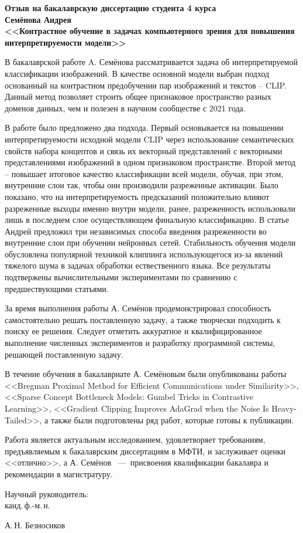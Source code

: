 \documentclass[12pt]{article}
\begin{document}
\thispagestyle{empty}
\begin{center}
\bigskip

\textbf{Отзыв на бакалаврскую диссертацию студента 4 курса\\
Семёнова Андрея\\
<<Контрастное обучение в задачах компьютерного зрения для повышения интерпретируемости модели>>}
\end{center}

В бакалаврской работе A. Семёнова рассматривается задача об интерпретируемой классификации изображений. В качестве основной модели выбран подход основанный на контрастном предобучении пар изображений и текстов -- CLIP. Данный метод позволяет строить общее признаковое пространство разных доменов данных, чем и полезен в научном сообществе с 2021 года.

В работе было предложено два подхода. Первый основывается на повышении интерпретируемости исходной модели CLIP через использование семантических свойств набора концептов и связь их векторный представлений с векторными представлениями изображений в одном признаковом пространстве. Второй метод -- повышает итоговое качество классификации всей модели, обучая, при этом, внутренние слои так, чтобы они производили разреженные активации. Было показано, что на интерпретируемость предсказаний положительно влияют разреженные выходы именно внутри модели, ранее, разреженность использовали лишь в последнем слое осуществляющем финальную классификацию. В статье Андрей предложил три независимых способа введения разреженности во внутренние слои при обучении нейронных сетей. Стабильность обучения модели обусловлена популярной техникой клиппинга использующегося из-за явлений тяжелого шума в задачах обработки ествественного языка. Все результаты подтвержены вычислительными экспериментами по сравнению с предшествующими статьями.

За время выполнения работы А. Семёнов продемонстрировал способность самостоятельно решать поставленную задачу, а также творчески подходить к поиску ее решения. Следует отметить аккуратное и квалифицированное выполнение численных экспериментов и разработку программной системы, решающей поставленную задачу.

В течение обучения в бакалавриате А. Семёновым были опубликованы работы <<Bregman Proximal Method for Efficient Communications under Similarity>>, <<Sparse Concept Bottleneck Models: Gumbel Tricks in Contrastive Learning>>, <<Gradient Clipping Improves AdaGrad when the Noise Is Heavy-Tailed>>, а также были подготовлены ряд работ, которые готовы к публикации.

Работа является актуальным исследованием, удовлетворяет требованиям, предъявляемым к бакалаврским диссертациям в МФТИ, и заслуживает оценки <<отлично>>, а А. Семёнов ~---~присвоения квалификации бакалавра и рекомендации в магистратуру.


\vspace{3cm}
\begin{flushleft}
Научный руководитель:\\
канд.\,ф.-м.\,н.\\
\end{flushleft}
\begin{flushright}
А.\,Н. Безносиков
\end{flushright}
\end{document}
